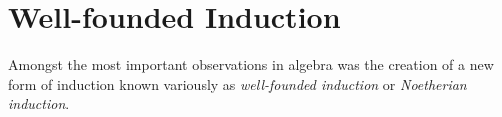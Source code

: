 \section{Well-founded Induction}
Amongst the most important observations in algebra was the creation 
of a new form of induction known variously as \emph{well-founded induction}
or \emph{Noetherian induction}.
